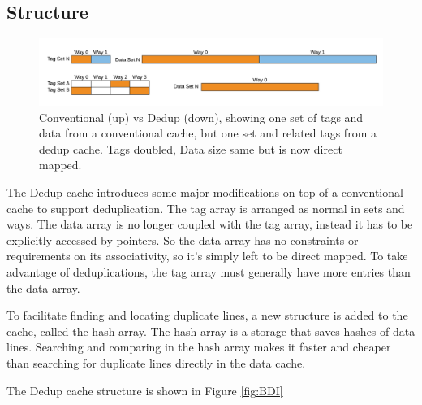 \subsection{Structure}
\label{ssec:DedupStructure}
\begin{figure}
    \includegraphics[width=\textwidth]{Dedup.pdf}
    \caption[Dedup Cache]{Conventional (up) vs Dedup (down), showing one set of tags and data from a conventional cache, but one set and related tags from a dedup cache. Tags doubled, Data size same but is now direct mapped.}
    \label{fig:Dedup}
\end{figure}
The Dedup cache introduces some major modifications on top of a conventional cache to support deduplication. The tag array is arranged as normal in sets and ways. The data array is no longer coupled with the tag array, instead it has to be explicitly accessed by pointers. So the data array has no constraints or requirements on its associativity, so it's simply left to be direct mapped. To take advantage of deduplications, the tag array must generally have more entries than the data array.\par
To facilitate finding and locating duplicate lines, a new structure is added to the cache, called the hash array. The hash array is a storage that saves hashes of data lines. Searching and comparing in the hash array makes it faster and cheaper than searching for duplicate lines directly in the data cache.

The Dedup cache structure is shown in Figure \ref{fig:BDI}

